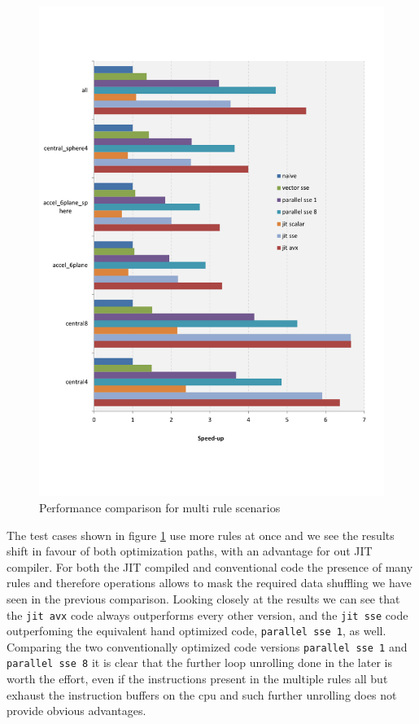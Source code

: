 \begin{figure}\centering
  \includegraphics[scale=0.6]{multi_rules.pdf}
  \caption{Performance comparison for multi rule scenarios
  \label{perf_multi}}
\end{figure}

The test cases shown in figure \ref{perf_multi} use more rules at once and we see the results shift in favour of both optimization paths, with an advantage for out JIT compiler. For both the JIT compiled and conventional code the presence of many rules and therefore operations allows to mask the required data shuffling we have seen in the previous comparison. Looking closely at the results we can see that the \texttt{jit avx} code always outperforms every other version, and the \texttt{jit sse} code outperfoming the equivalent hand optimized code, \texttt{parallel sse 1}, as well. Comparing the two conventionally optimized code versions \texttt{parallel sse 1} and \texttt{parallel sse 8} it is clear that the further loop unrolling done in the later is worth the effort, even if the instructions present in the multiple rules all but exhaust the instruction buffers on the cpu and such further unrolling does not provide obvious advantages.

